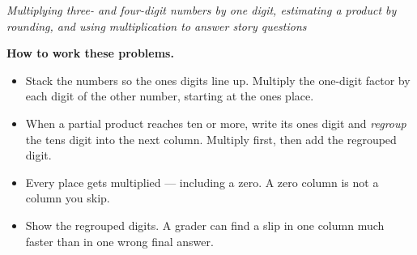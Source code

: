 \documentclass[12pt]{article}
\begin{document}

\begin{center}
\textit{Multiplying three- and four-digit numbers by one digit, estimating a
product by rounding, and using multiplication to answer story questions}
\end{center}

\noindent\textbf{How to work these problems.}
\begin{itemize}[leftmargin=1.2cm, itemsep=2pt, topsep=2pt]
\item Stack the numbers so the ones digits line up. Multiply the one-digit
factor by each digit of the other number, starting at the ones place.
\item When a partial product reaches ten or more, write its ones digit and
\emph{regroup} the tens digit into the next column. Multiply first, then add
the regrouped digit.
\item Every place gets multiplied --- including a zero. A zero column is not a
column you skip.
\item Show the regrouped digits. A grader can find a slip in one column much
faster than in one wrong final answer.
\end{itemize}

\vspace{0.15cm}









\end{document}
